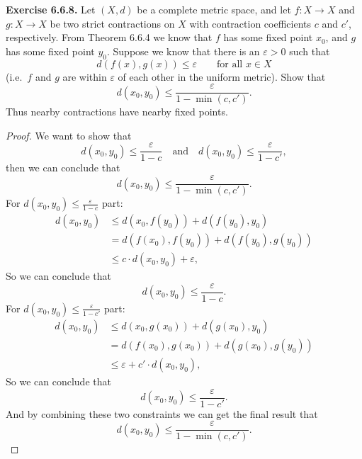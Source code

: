 \begin{problem}
    \textbf{Exercise 6.6.8.}
    Let $(X,d)$ be a complete metric space, and let $f:X\to X$ and $g:X\to X$ be two strict
    contractions on $X$ with contraction coefficients $c$ and $c'$, respectively.
    From Theorem 6.6.4 we know that $f$ has some fixed point $x_0$, and $g$ has some fixed point
    $y_0$. Suppose we know that there is an $\varepsilon>0$ such that
    $$
    d(f(x),g(x))\le \varepsilon
    \qquad \text{for all } x\in X
    $$
    (i.e.\ $f$ and $g$ are within $\varepsilon$ of each other in the uniform metric).
    Show that
    $$
    d(x_0,y_0)\le \frac{\varepsilon}{1-\min(c,c')}.
    $$
    Thus nearby contractions have nearby fixed points.
\end{problem}

\begin{proof}
    We want to show that
    \[
        d(x_0, y_0) \le \frac{\varepsilon}{1-c} \quad \text{and} \quad d(x_0, y_0) \le \frac{\varepsilon}{1-c'},
    \]
    then we can conclude that 
    \[
        d(x_0, y_0) \le \frac{\varepsilon}{1-\min{(c,c')}}.
    \]
    For $d(x_0, y_0) \le \frac{\varepsilon}{1-c}$ part:
    \[
        \begin{aligned}
            d(x_0,y_0) &\le d(x_0, f(y_0)) + d(f(y_0), y_0) \\
            &= d(f(x_0), f(y_0)) + d(f(y_0), g(y_0)) \\
            &\le c\cdot d(x_0,y_0) + \varepsilon,
        \end{aligned}
    \]
    So we can conclude that 
    \[
        d(x_0, y_0) \le \frac{\varepsilon}{1-c}.
    \]
    For $d(x_0, y_0) \le \frac{\varepsilon}{1-c'}$ part:
    \[
        \begin{aligned}
            d(x_0,y_0) &\le d(x_0, g(x_0)) + d(g(x_0), y_0) \\
            &= d(f(x_0), g(x_0)) + d(g(x_0), g(y_0)) \\
            &\le \varepsilon + c'\cdot d(x_0,y_0),
        \end{aligned}
    \]
    So we can conclude that 
    \[
        d(x_0, y_0) \le \frac{\varepsilon}{1-c'}.
    \]
    And by combining these two constraints we can get the final result that
    \[
        d(x_0, y_0) \le \frac{\varepsilon}{1-\min{(c,c')}}.
    \]
\end{proof}

